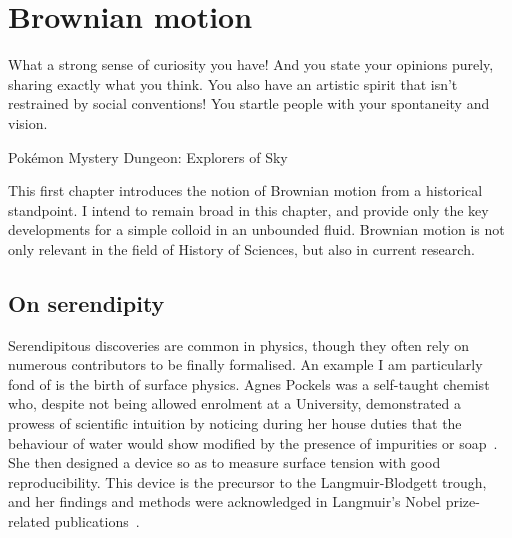 \chapter{Brownian motion}
\label{chapter1}

\epigraph{What a strong sense of curiosity you have! And you state your opinions purely, sharing exactly what you think. You also have an artistic spirit that isn't restrained by social conventions! You startle people with your spontaneity and vision.}{Pokémon Mystery Dungeon: Explorers of Sky}
This first chapter introduces the notion of Brownian motion from a historical standpoint. I intend to remain broad in this chapter, and provide only the key developments for a simple colloid in an unbounded fluid. Brownian motion is not only relevant in the field of History of Sciences, but also in current research.

\section{On serendipity}

Serendipitous discoveries are common in physics, though they often rely on numerous contributors to be finally formalised. An example I am particularly fond of is the birth of surface physics. Agnes Pockels was a self-taught chemist who, despite not being allowed enrolment at a University, demonstrated a prowess of scientific intuition by noticing during her house duties that the behaviour of water would show modified by the presence of impurities or soap~\cite{pockels1891surface, derrick1982agnes}. She then designed a device so as to measure surface tension with good reproducibility. This device is the precursor to the Langmuir-Blodgett trough, and her findings and methods were acknowledged in Langmuir's Nobel prize-related publications~\cite{langmuir1917liquids}.

